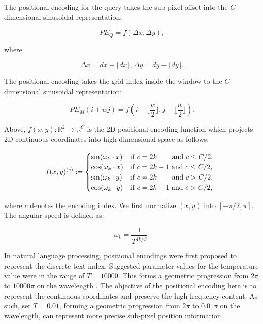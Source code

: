 \documentclass[10pt,twocolumn,letterpaper]{article}
\begin{document}
The positional encoding for the query takes the sub-pixel offset into the $C$ dimensional sinusoidal representation:

\begin{equation}
    PE_Q = f(\Delta x, \Delta y),
\end{equation}

\noindent where

\begin{equation}
    \Delta x = dx - \lfloor dx \rfloor, \Delta y = dy - \lfloor dy \rfloor.
\end{equation}

\noindent The positional encoding takes the grid index inside the window to the $C$ dimensional sinusoidal representation:

\begin{equation}
    PE_M(i+wj) = f(i-\lfloor \frac{w}{2} \rfloor, j-\lfloor \frac{w}{2} \rfloor).
\end{equation}

\noindent Above, $f(x,y):\mathbb{R}^2 \rightarrow \mathbb{R}^C$ is the 2D positional encoding function which projects 2D continuous coordinates into high-dimensional space as follows:

\begin{equation}
    \!\!\!\!f(x,y)^{(c)}:=
     \begin{cases} 
      \sin(\omega_k \cdot x) & \text{if } c = 2k   \text{ \hphantom{$ +1 \,$} and } c \leq C/2,\\
      \cos(\omega_k \cdot x) & \text{if } c = 2k+1 \text{ and } c\leq C/2,\\
      \sin(\omega_k \cdot y) & \text{if } c = 2k   \text{ \hphantom{$ +1 \,$} and } c>C/2,\\
      \cos(\omega_k \cdot y) & \text{if } c = 2k+1 \text{ and } c>C/2,\\
   \end{cases}
\end{equation}

\noindent where $c$ denotes the encoding index.
We first normalize $(x,y)$ into $[-\pi/2, \pi]$. The angular speed is defined as:

\begin{equation}
    \omega_k = \frac{1}{T^{4k/C}}.
\end{equation}

In natural language processing, positional encodings were first proposed to represent the discrete text index.  Suggested parameter values for the temperature value were in the range of $T=10000$.  This forms a geometric progression from $2\pi$ to $10000\pi$ on the wavelength \cite{vaswani2017attention}. The objective of the positional encoding here is to represent the continuous coordinates and preserve the high-frequency content.  As such, set $T=0.01$, forming a geometric progression from $2\pi$ to $0.01\pi$ on the wavelength, can represent more precise sub-pixel position information. 
\end{document}
